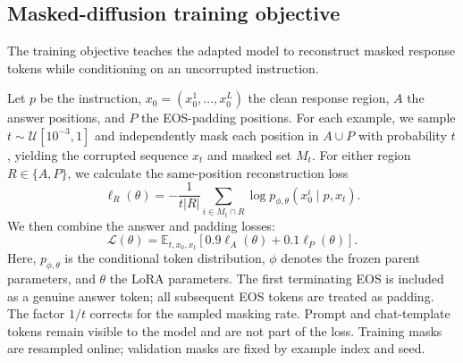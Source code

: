 \documentclass{article}
\begin{document}
\subsection{Masked-diffusion training objective}

The training objective teaches the adapted model to reconstruct masked response tokens while conditioning on an uncorrupted instruction.

Let $p$ be the instruction, $x_0=(x_0^1,\ldots,x_0^L)$ the clean response region, $A$ the answer positions, and $P$ the EOS-padding positions. For each example, we sample $t\sim\mathcal{U}[10^{-3},1]$ and independently mask each position in $A\cup P$ with probability $t$, yielding the corrupted sequence $x_t$ and masked set $M_t$. For either region $R\in\{A,P\}$, we calculate the same-position reconstruction loss
\begin{equation}
\ell_R(\theta)=-\frac{1}{t|R|}
\sum_{i\in M_t\cap R}
\log p_{\phi,\theta}(x_0^i\mid p,x_t).
\label{eq:region-loss}
\end{equation}
We then combine the answer and padding losses:
\begin{equation}
\mathcal{L}(\theta)=\mathbb{E}_{t,x_0,x_t}
\left[0.9\ell_A(\theta)+0.1\ell_P(\theta)\right].
    \label{eq:objective}
\end{equation}
Here, $p_{\phi,\theta}$ is the conditional token distribution, $\phi$ denotes the frozen parent parameters, and $\theta$ the LoRA parameters. The first terminating EOS is included as a genuine answer token; all subsequent EOS tokens are treated as padding. The factor $1/t$ corrects for the sampled masking rate. Prompt and chat-template tokens remain visible to the model and are not part of the loss. Training masks are resampled online; validation masks are fixed by example index and seed.

\begin{table}[t]
\caption{Diffusion model names matched to parent models, their trainable parameter counts, and measured time for 25,000 updates. All trainable parameters are rank-1024 Q/V LoRA weights.}
\label{tab:models}
\centering
\small
{}
\end{table}
\end{document}

